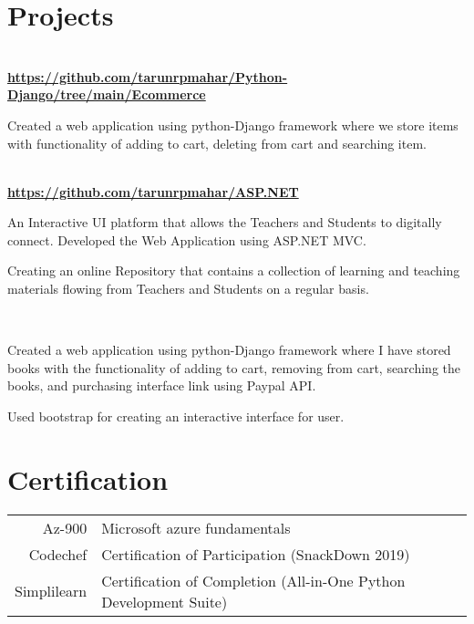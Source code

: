 \documentclass[]{deedy-resume-openfont}
\begin{document}
\begin{minipage}[t]{0.66\textwidth}

\section{Projects}

\\
\location{}
\textbf{\href{https://github.com/tarunrpmahar/Python-Django/tree/main/Ecommerce}{https://github.com/tarunrpmahar/Python-Django/tree/main/Ecommerce}}
\begin{tightemize}
\item Created a web application using python-Django framework where
we store items with functionality of adding to cart, deleting from cart and searching item.
\end{tightemize}
\sectionsep

\\
\location{}
\textbf{\href{https://github.com/tarunrpmahar/ASP.NET_MVC/}{https://github.com/tarunrpmahar/ASP.NET}}
\begin{tightemize}
\item An Interactive UI platform that allows the Teachers and Students to
digitally connect. Developed the Web Application using ASP.NET
MVC.
\item Creating an online Repository that contains a collection of learning
and teaching materials flowing from Teachers and Students on a
regular basis.
\end{tightemize}
\sectionsep

\\
\location{}
\begin{tightemize}
\item Created a web application using python-Django framework where I have stored books with the functionality of adding to cart, removing from cart, searching the books, and purchasing interface link using Paypal API.
\item Used bootstrap for creating an interactive interface for user.
\end{tightemize}
\sectionsep


\section{Certification} 
\begin{tabular}{rll}
Az-900 & Microsoft azure fundamentals\\
Codechef  & Certification of Participation (SnackDown 2019)\\
Simplilearn  & Certification of Completion (All-in-One Python
Development Suite)\\
\end{tabular}
\sectionsep


\end{minipage}
\end{document}
